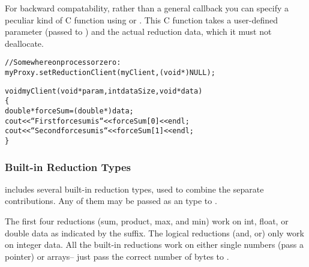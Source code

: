 For backward compatability, rather than a general callback you can
specify a peculiar kind of C function using 
or .  This C function takes a user-defined
parameter (passed to ) and the actual reduction data,
which it must not deallocate.

\begin{alltt}
  //Somewhere on processor zero:
  myProxy.setReductionClient(myClient,(void *)NULL);

void myClient(void *param,int dataSize,void *data)
\{
  double *forceSum=(double *)data;
  cout<<``First force sum is ``<<forceSum[0]<<endl;
  cout<<``Second force sum is ``<<forceSum[1]<<endl;
\}
\end{alltt}



\subsubsection{Built-in Reduction Types}
\label{builtin_reduction}

\charmpp{} includes several built-in reduction types, used to combine 
the separate contributions.  Any of them may be passed as an
 type to .

The first four reductions (sum, product, max, and min) work on int,
float, or double data as indicated by the suffix.  The logical
reductions (and, or) only work on integer data.  All the built-in
reductions work on either single numbers (pass a pointer) or arrays-- just
pass the correct number of bytes to .

